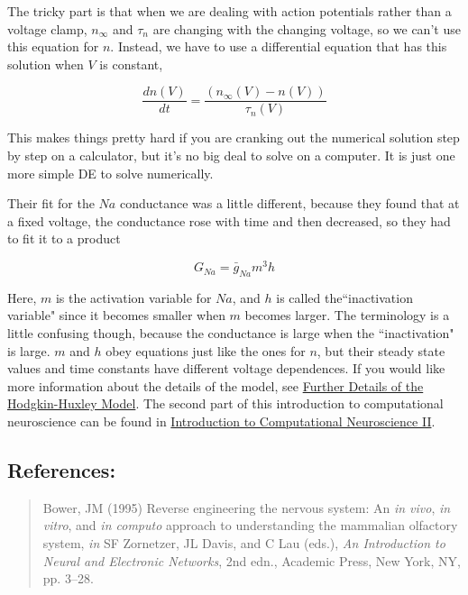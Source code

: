 \documentclass[12pt]{article}
\begin{document}
The tricky part is that when we are dealing with action potentials rather than a voltage clamp, $n_\infty$ and $\tau_n$ are changing with the changing voltage, so we can't use this equation for $n$. Instead, we have to use a differential equation that has this solution when $V$ is constant,

\begin{equation}
		\frac{dn(V)}{dt} = \frac{(n_\infty(V) - n(V))}{\tau_n(V)}
\label{eq:eq4}	
\end{equation}

This makes things pretty hard if you are cranking out the numerical solution step by step on a calculator, but it's no big deal to solve on a computer. It is just one more simple DE to solve numerically.

Their fit for the $Na$ conductance was a little different, because they found that at a fixed voltage, the conductance rose with time and then decreased, so they had to fit it to a product

\begin{equation}
		G_{Na} = \bar{g}_{Na}m^{3}h
\label{eq:eq5}		
\end{equation}

Here, $m$ is the activation variable for $Na$, and $h$ is called the``inactivation variable" since it becomes smaller when $m$ becomes larger. The terminology is a little confusing though, because the conductance is large when the ``inactivation" is large. $m$ and $h$ obey equations just like the ones for $n$, but their steady state values and time constants have different voltage dependences. If you would like more information about the details of the model, see \href{../hh-model-details/hh-model-details.tex}{Further Details of the Hodgkin-Huxley Model}. The second part of this introduction to computational neuroscience can be found in  \href{../compneurosci-2/compneurosci2.tex}{Introduction to Computational Neuroscience II}.

\subsection*{References:}

\begin{quote}

Bower, JM (1995) Reverse engineering the nervous system: An {\it in vivo}, {\it in vitro}, and {\it in computo} approach to understanding the mammalian olfactory system, {\it in} SF Zornetzer, JL Davis, and C Lau (eds.), {\it An Introduction to Neural and Electronic Networks}, 2nd edn., Academic Press, New York, NY, pp. 3--28.

\end{quote}
\end{document}

